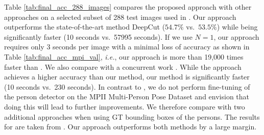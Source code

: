 \documentclass[runningheads]{llncs}
\newcommand{\ie}{\mbox{\emph{i.e.}}}
\begin{document}
Table \ref{tab:final_acc_288_images} compares the proposed approach with other approaches on a selected subset of 288 test images used in \cite{pishchulin2015deepcut}. Our approach outperforms the state-of-the-art method DeepCut \cite{pishchulin2015deepcut} ($54.7\%$ vs.~$53.5\%$) while being significantly faster (10 seconds vs.~57995 seconds). If we use $N=1$, our approach requires only 3 seconds per image with a minimal loss of accuracy as shown in Table \ref{tab:final_acc_mpi_val}, \ie, our approach is more than 19,000 times faster than \cite{pishchulin2015deepcut}. We also compare with a concurrent work \cite{insafutdinov2016deepercut}. While the approach \cite{insafutdinov2016deepercut} achieves a higher accuracy than our method, our method is significantly faster (10 seconds vs.~230 seconds). In contrast to \cite{insafutdinov2016deepercut}, we do not perform fine-tuning of the person detector on the MPII Multi-Person Pose Dataset and envision that doing this will lead to further improvements. We therefore compare with two additional approaches \cite{pishchulin2015deepcut, chen_nips2014} when using GT bounding boxes of the persons. The results for \cite{chen_nips2014} are taken from \cite{pishchulin2015deepcut}. Our approach outperforms both methods by a large margin.

\begin{table*}[t]
  \centering
  \footnotesize
  \setlength{\tabcolsep}{2.8pt} 
\def\arraystretch{1}

  \caption{Pose estimation results (AP) on the withheld test set of the MPII Multi-Person Pose Dataset.}
  \label{tab:final_acc_full_mpi}
\end{table*}
\end{document}
